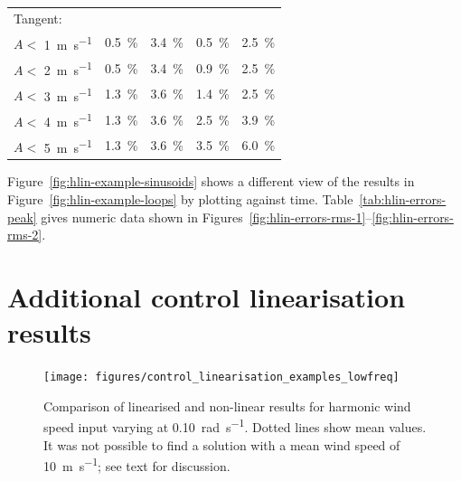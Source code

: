 \documentclass[preprint]{elsarticle}
\begin{document}
\begin{table}
\begin{tabular}{lrrrr}
    \multicolumn{4}{l}{Tangent:} \\
    $A<$ \SI{ 1 }{\metre\per\second}& \SI{ 0.5 }{\%}& \SI{ 3.4 }{\%}& \SI{ 0.5 }{\%}& \SI{ 2.5 }{\%}\\
    $A<$ \SI{ 2 }{\metre\per\second}& \SI{ 0.5 }{\%}& \SI{ 3.4 }{\%}& \SI{ 0.9 }{\%}& \SI{ 2.5 }{\%}\\
    $A<$ \SI{ 3 }{\metre\per\second}& \SI{ 1.3 }{\%}& \SI{ 3.6 }{\%}& \SI{ 1.4 }{\%}& \SI{ 2.5 }{\%}\\
    $A<$ \SI{ 4 }{\metre\per\second}& \SI{ 1.3 }{\%}& \SI{ 3.6 }{\%}& \SI{ 2.5 }{\%}& \SI{ 3.9 }{\%}\\
    $A<$ \SI{ 5 }{\metre\per\second}& \SI{ 1.3 }{\%}& \SI{ 3.6 }{\%}& \SI{ 3.5 }{\%}& \SI{ 6.0 }{\%}\\

    \bottomrule
  \end{tabular}
\end{table}

Figure~\ref{fig:hlin-example-sinusoids} shows a different view of the results in
Figure~\ref{fig:hlin-example-loops} by plotting against time.
Table~\ref{tab:hlin-errors-peak} gives numeric data shown in
Figures~\ref{fig:hlin-errors-rms-1}--\ref{fig:hlin-errors-rms-2}.



\section{Additional control linearisation results}
\label{sec:appendix-control-results}

\begin{figure}
  \centering
  \hspace*{-1cm}\texttt{[image: figures/control\_linearisation\_examples\_lowfreq]}
  \caption{Comparison of linearised and non-linear results for harmonic
    wind speed input varying at \SI{0.10}{\radian\per\second}. Dotted
    lines show mean values. It was not possible to find a solution
    with a mean wind speed of \SI{10}{\metre\per\second}; see text for
    discussion.}
\label{fig:control-lin-lowfreq}
\end{figure}
\end{document}
